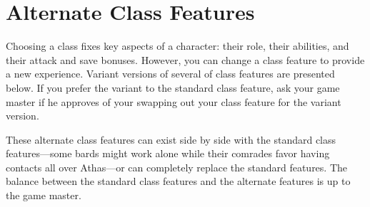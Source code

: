 \section{Alternate Class Features}
Choosing a class fixes key aspects of a character: their role, their abilities, and their attack and save bonuses. However, you can change a class feature to provide a new experience. Variant versions of several of class features are presented below. If you prefer the variant to the standard class feature, ask your game master if he approves of your swapping out your class feature for the variant version.

These alternate class features can exist side by side with the standard class features---some bards might work alone while their comrades favor having contacts all over Athas---or can completely replace the standard features. The balance between the standard class features and the alternate features is up to the game master.

